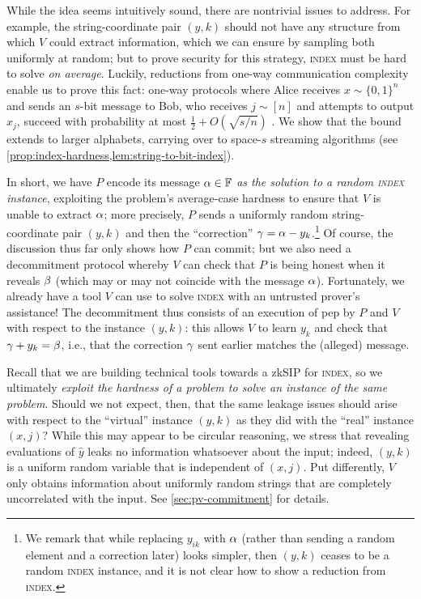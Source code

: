 \documentclass[a4paper,UKenglish,cleveref, autoref, thm-restate]{lipics-v2021}
\theoremstyle{definition}
\newcommand{\zksip}{\textrm{zkSIP}}
\newcommand{\field}{\mathbb{F}}
\newcommand{\bitset}{\{0,1\}}
\newcommand{\indexproblem}{\normalfont\textsc{index}\xspace}
\newcommand{\pepprotocol}{\textsf{pep}\xspace}
\newcommand{\pcommitstring}{y}
\def\fe#1{
    \ifnum#1=1
        \alpha
    \else
    \ifnum#1=2
        \beta
    \else
    \ifnum#1=3
        \gamma
    \fi\fi\fi
}
\begin{document}
    While the idea seems intuitively sound, there are nontrivial issues to address. For example, the string-coordinate pair $(\pcommitstring,k)$ should not have any structure from which $V$ could extract information, which we can ensure by sampling both uniformly at random; but to prove security for this strategy, \indexproblem must be hard to solve \emph{on average}. Luckily, reductions from one-way communication complexity enable us to prove this fact: one-way protocols where Alice receives $x \sim \bitset^n$ and sends an $s$-bit message to Bob, who receives $j \sim [n]$ and attempts to output $x_j$, succeed with probability at most $\frac1{2} + O(\sqrt{s/n})$ \cite{RY20}. We show that the bound extends to larger alphabets, carrying over to space-$s$ streaming algorithms (see \cref{prop:index-hardness,lem:string-to-bit-index}).
    
    In short, we have $P$ encode its message $\fe1 \in \field$ \emph{as the solution to a random \indexproblem instance}, exploiting the problem's average-case hardness to ensure that $V$ is unable to extract $\fe1$; more precisely, $P$ sends a uniformly random string-coordinate pair $(\pcommitstring, k)$ and then the ``correction'' $\fe3 = \fe1 - \pcommitstring_k$.\footnote{We remark that while replacing $\pcommitstring_{ik}$ with $\fe1$ (rather than sending a random element and a correction later) looks simpler, then $(\pcommitstring,k)$ ceases to be a random \indexproblem instance, and it is not clear how to show a reduction from \indexproblem.} Of course, the discussion thus far only shows how $P$ can commit; but we also need a decommitment protocol whereby $V$ can check that $P$ is being honest when it reveals $\fe2$ (which may or may not coincide with the message $\fe1$). Fortunately, we already have a tool $V$ can use to solve \indexproblem with an untrusted prover's assistance! The decommitment thus consists of an execution of \pepprotocol by $P$ and $V$ with respect to the instance $(\pcommitstring,k)$: this allows $V$ to learn $\pcommitstring_k$ and check that $\fe3 + \pcommitstring_k = \fe2$, i.e., that the correction $\fe3$ sent earlier matches the (alleged) message.
    
    Recall that we are building technical tools towards a \zksip{} for \indexproblem, so we ultimately \emph{exploit the hardness of a problem to solve an instance of the same problem}. Should we not expect, then, that the same leakage issues should arise with respect to the ``virtual'' instance $(\pcommitstring, k)$ as they did with the ``real'' instance $(x,j)$? While this may appear to be circular reasoning, we stress that revealing evaluations of $\hat y$ leaks no information whatsoever about the input; indeed, $(\pcommitstring,k)$ is a uniform random variable that is independent of $(x,j)$. Put differently, $V$ only obtains information about uniformly random strings that are completely uncorrelated with the input. See \cref{sec:pv-commitment} for details.
    
\end{document}
